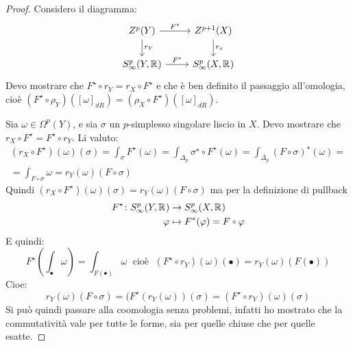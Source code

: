 \begin{proof}
  Considero il diagramma:
  \[
    \begin{tikzcd}
      Z^p(Y) \rar{F^\star} \dar{r_Y} & Z^{p+1}(X) \dar{r_x} \\
      S^p_\infty(Y, \RN{}) \rar{F^\star} & S^p_\infty(X, \RN{})
    \end{tikzcd}
  \]
  Devo mostrare che $ F^\star \circ r_Y = r_X \circ F^\star $ e che è ben definito il passaggio
  all'omologia, cioè  $ (F^\star \circ \rho_Y)([\omega]_{dR}) = (\rho_X \circ F^\star)([\omega]_{dR}) $.

  Sia $ \omega \in \Omega^p(Y) $, %
  e sia $ \sigma $ un $ p $-simplesso singolare liscio in $ X $. Devo
  mostrare che $ r_X \circ F^\star = F^\star \circ r_Y $. Li valuto:
  \begin{gather*}
    (r_X \circ F^\star)(\omega)(\sigma) = \int_\sigma F^\star(\omega) = \int_{\Delta_p} \sigma^\star \circ F^\star (\omega) = \int_{\Delta_p} (F \circ \sigma)^\star(\omega) = \\
    = \int_{F \circ \sigma} \omega = r_Y(\omega)(F \circ \sigma)
  \end{gather*}
  Quindi $ (r_X \circ F^\star)(\omega)(\sigma) = r_Y(\omega)(F \circ \sigma) $ ma per la definizione di pullback
  \begin{align*}
    F^\star \colon S^p_\infty(Y, \RN{}) & \to S^p_\infty(X, \RN{}) \\
    \phi & \mapsto F^*(\phi) = F \circ \phi
  \end{align*}
  E quindi:
  \[
    F^\star \left(\int_\bullet \omega \right) = \int_{F(\bullet)} \omega \; \text{ cioè }\; (F^\star \circ r_Y)(\omega)(\bullet) = r_Y(\omega)(F (\bullet))
  \]
  Cioe:
  \[
    r_Y(\omega)(F \circ \sigma) = (F^\star (r_Y(\omega))(\sigma) = (F^\star \circ r_Y)(\omega)(\sigma)
  \]
  Si può quindi passare alla coomologia senza problemi, infatti ho mostrato che
  la commutatività vale per tutte le forme, sia per quelle chiuse che per quelle
  esatte.
\end{proof}
